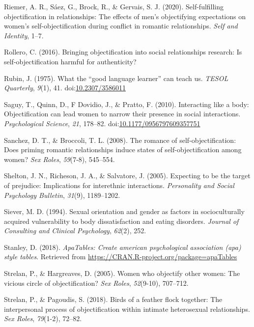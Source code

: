 \documentclass[man]{apa6}
\begin{document}
\hypertarget{ref-riemer2020self}{}
Riemer, A. R., Sáez, G., Brock, R., \& Gervais, S. J. (2020).
Self-fulfilling objectification in relationships: The effects of men's
objectifying expectations on women's self-objectification during
conflict in romantic relationships. \emph{Self and Identity}, 1--7.

\hypertarget{ref-rollero2016bringing}{}
Rollero, C. (2016). Bringing objectification into social relationships
research: Is self-objectification harmful for authenticity?

\hypertarget{ref-rubin1975}{}
Rubin, J. (1975). What the ``good language learner'' can teach us.
\emph{TESOL Quarterly}, \emph{9}(1), 41.
doi:\href{https://doi.org/10.2307/3586011}{10.2307/3586011}

\hypertarget{ref-saguyetal2010}{}
Saguy, T., Quinn, D., F Dovidio, J., \& Pratto, F. (2010). Interacting
like a body: Objectification can lead women to narrow their presence in
social interactions. \emph{Psychological Science}, \emph{21}, 178--82.
doi:\href{https://doi.org/10.1177/0956797609357751}{10.1177/0956797609357751}

\hypertarget{ref-sanchez2008romance}{}
Sanchez, D. T., \& Broccoli, T. L. (2008). The romance of
self-objectification: Does priming romantic relationships induce states
of self-objectification among women? \emph{Sex Roles}, \emph{59}(7-8),
545--554.

\hypertarget{ref-shelton2005expecting}{}
Shelton, J. N., Richeson, J. A., \& Salvatore, J. (2005). Expecting to
be the target of prejudice: Implications for interethnic interactions.
\emph{Personality and Social Psychology Bulletin}, \emph{31}(9),
1189--1202.

\hypertarget{ref-siever1994sexual}{}
Siever, M. D. (1994). Sexual orientation and gender as factors in
socioculturally acquired vulnerability to body dissatisfaction and
eating disorders. \emph{Journal of Consulting and Clinical Psychology},
\emph{62}(2), 252.

\hypertarget{ref-R-apaTables}{}
Stanley, D. (2018). \emph{ApaTables: Create american psychological
association (apa) style tables}. Retrieved from
\url{https://CRAN.R-project.org/package=apaTables}

\hypertarget{ref-strelan2005women}{}
Strelan, P., \& Hargreaves, D. (2005). Women who objectify other women:
The vicious circle of objectification? \emph{Sex Roles},
\emph{52}(9-10), 707--712.

\hypertarget{ref-strelan2018birds}{}
Strelan, P., \& Pagoudis, S. (2018). Birds of a feather flock together:
The interpersonal process of objectification within intimate
heterosexual relationships. \emph{Sex Roles}, \emph{79}(1-2), 72--82.
\end{document}
